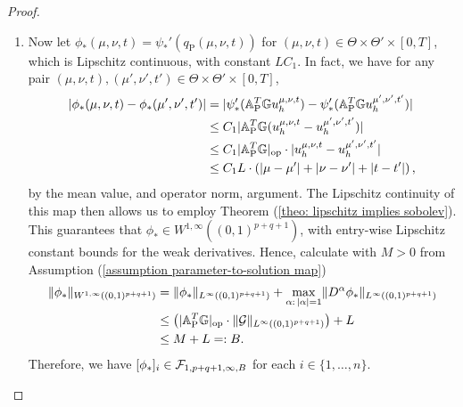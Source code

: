 \begin{proof}
\begin{enumerate}
        \item[-] Now let $\phi_*(\mu, \nu, t) = \psi_*'(q_\text{P}(\mu, \nu, t))$ for 
        $(\mu, \nu, t) \in \Theta \times \Theta' \times [0, T]$, which is 
        Lipschitz continuous, with constant $L C_1$. In fact, we have for any pair $(\mu, \nu, t), (\mu', \nu', t')
        \in \Theta \times \Theta' \times [0, T]$,
        \begin{align*}
            \lvert \phi_*(\mu, \nu, t) - \phi_*(\mu', \nu', t') \rvert &= \lvert \psi_*'(\mathbb{A}_\text{P}^T \mathbb{G} u_h^{\mu, \nu, t}) - 
            \psi_*'(\mathbb{A}_\text{P}^T \mathbb{G} u_h^{\mu', \nu', t'}) \rvert \\
            &\leq C_1 \lvert \mathbb{A}_\text{P}^T \mathbb{G} (u_h^{\mu, \nu, t} - u_h^{\mu', \nu', t'}) \rvert \\
            &\leq C_1 \lvert \mathbb{A}_\text{P}^T \mathbb{G} \rvert_\text{op} \cdot \lvert u_h^{\mu, \nu, t} - u_h^{\mu', \nu', t'} \rvert \\
            &\leq C_1 L \cdot \left(\lvert \mu - \mu' \rvert + \lvert \nu - \nu' \rvert + \lvert t - t' \rvert \right),
        \end{align*} 
        by the mean value, and operator norm, argument.
        The Lipschitz continuity of this map then allows us to employ Theorem (\ref{theo: lipschitz implies sobolev}).
        This guarantees that $\phi_* \in W^{1, \infty}((0, 1)^{p+q+1})$, with entry-wise Lipschitz constant bounds for the
        weak derivatives.
        Hence, calculate with $M>0$ from Assumption (\ref{assumption parameter-to-solution map})
        \begin{align*}
            \lVert \phi_* \rVert_{W^{1, \infty}((0,1)^{p+q+1})} &= \lVert \phi_* \rVert_{L^\infty((0,1)^{p+q+1})} 
            + \max\limits_{\alpha: \, \lvert \alpha \rvert = 1} \lVert D^\alpha \phi_* \rVert_{L^\infty((0,1)^{p+q+1})} \\
            &\leq \left(\lvert \mathbb{A}_\text{P}^T \mathbb{G} \rvert_\text{op} \cdot \lVert \mathcal{G} \rVert_{L^\infty((0,1)^{p+q+1})} \right) + L \\
            &\leq M + L =: B.
        \end{align*}
        Therefore, we have $[\phi_*]_i \in \mathcal{F}_{1, p+q+1, \infty, B}$ for each $i \in \{1, \dots, n\}$.


\end{enumerate}
\end{proof}
